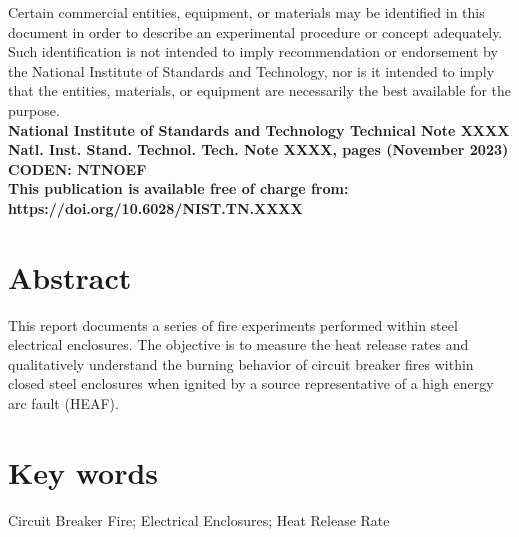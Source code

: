 \documentclass[12pt]{article}
\newcommand{\pubnumber}{XXXX}
\newcommand{\DOI}{https://doi.org/10.6028/NIST.TN.XXXX}
\newcommand{\monthyear}{November 2023}
\begin{document}
\begin{titlepage}
\begin{flushright}
\footnotesize  Certain commercial entities, equipment, or materials may be identified in this document in order to describe an experimental procedure or concept adequately. Such identification is not intended to imply recommendation or endorsement by the National Institute of Standards and Technology, nor is it intended to imply that the entities, materials, or equipment are necessarily the best available for the purpose.\\
\vfill
\normalsize \textbf{National Institute of Standards and Technology Technical Note \pubnumber\\
Natl. Inst. Stand. Technol. Tech. Note \pubnumber, \pageref{LastPage} pages (\monthyear)} \\
\textbf{CODEN: NTNOEF}\\
\vspace{12pt}
\textbf{This publication is available free of charge from: \DOI}
\vfill
\end{flushright}
\end{titlepage}


\section*{Abstract}

\normalsize This report documents a series of fire experiments performed within steel electrical enclosures. The objective is to measure the heat release rates and qualitatively understand the burning behavior of circuit breaker fires within closed steel enclosures when ignited by a source representative of a high energy arc fault (HEAF).  \\

\section*{Key words}
\normalsize Circuit Breaker Fire; Electrical Enclosures; Heat Release Rate\\
\pagebreak
\begin{center}
	\tableofcontents
	\listoftables
	\listoffigures
\end{center}
\end{document}
